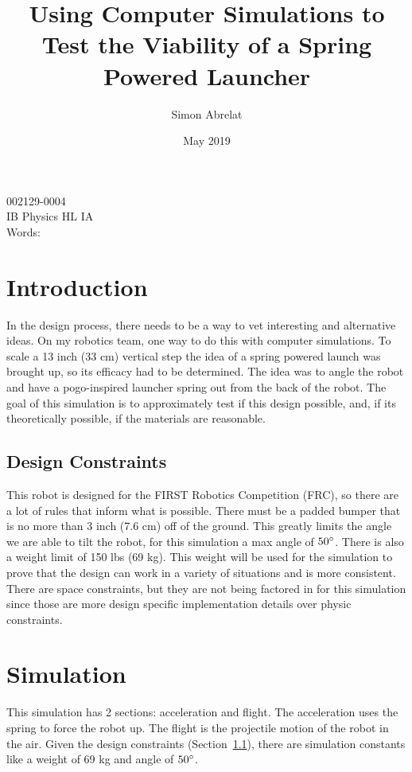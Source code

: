 \documentclass[12pt, letterpaper]{article}
\title{Using Computer Simulations to Test the Viability of a Spring Powered Launcher}
\author{Simon Abrelat}
\date{May 2019}
\begin{document}
\large
\doublespace{}
\parindent=0.5in

{\fontsize{12}{14.4}
  {\singlespace
    \maketitle
    \begin{center}
    002129-0004 \\
    \vspace{4mm}
    IB Physics HL IA \\
    \vspace{4mm}
    Words:  \\ %
    \end{center}
  }
}	


\newpage
\tableofcontents
{}
\newpage

\section{Introduction} \label{sec:Introduction}
In the design process, there needs to be a way to vet interesting and alternative ideas. On my robotics team,
one way to do this with computer simulations. To scale a 13 inch (33 cm) vertical step the idea of a spring
powered launch was brought up, so its efficacy had to be determined. The idea was to angle the robot and have
a pogo-inspired launcher spring out from the back of the robot. The goal of this simulation is to
approximately test if this design possible, and, if its theoretically possible, if the materials are
reasonable.

\subsection{Design Constraints} \label{sec:DesignConstraints}
This robot is designed for the FIRST Robotics Competition (FRC), so there are a lot of rules that inform what
is possible. There must be a padded bumper that is no more than 3 inch (7.6 cm) off of the ground. This
greatly limits the angle we are able to tilt the robot, for this simulation a max angle of $50\degree$. There
is also a weight limit of 150 lbs (69 kg). This weight will be used for the simulation to prove that the
design can work in a variety of situations and is more consistent. There are space constraints, but they are
not being factored in for this simulation since those are more design specific implementation details over
physic constraints.

\section{Simulation} \label{Simulation}
This simulation has 2 sections: acceleration and flight. The acceleration uses the spring to force the robot
up. The flight is the projectile motion of the robot in the air. Given the design constraints
(Section~\ref{sec:DesignConstraints}), there are simulation constants like a weight of 69 kg and angle of 
$50\degree$.
\end{document}
